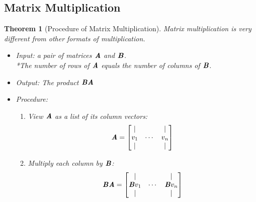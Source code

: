 \documentclass[12pt, a4paper]{article}
\newtheorem{thm}{Theorem}[subsection]
\def\matrixA{\textbf{\emph{A}}}
\def\matrixB{\textbf{\emph{B}}}
\begin{document}
\subsection{Matrix Multiplication}
\begin{thm}[Procedure of Matrix Multiplication]
Matrix multiplication is very different from other formats of multiplication.
\begin{itemize}
	\item Input: a pair of matrices $\matrixA$ and $\matrixB$. \\
	*The number of rows of $\matrixA$ equals the number of columns of $\matrixB$.
	\item Output: The product $\matrixB\matrixA$
	\item Procedure: 
	\begin{enumerate}
		\item View $\matrixA$ as a list of its column vectors: 
		\[\matrixA=\begin{bmatrix}|& &|\\v_1&\cdots &v_n\\|& &|\end{bmatrix}\]
		\item Multiply each column by $\matrixB$: 
		\[\matrixB\matrixA =\begin{bmatrix}|& &|\\\matrixB v_1&\cdots &\matrixB v_n\\|& &|\end{bmatrix}\]
	\end{enumerate}
\end{itemize}	
\end{thm}
\end{document}
